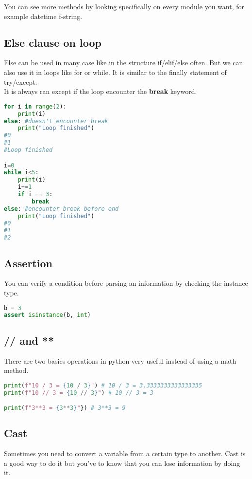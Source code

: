 \documentclass[a4paper, 12pt, titlepage]{scrartcl} %
\begin{document}
You can see more methods by looking specifically on every module you want, for example datetime f-string.

\subsection{Else clause on loop}
\label{subsec:Else}
Else can be used in many case like in the structure if/elif/else often. But we can also use it in loops like for or while. It is similar to the finally statement of try/except. \\
It is always ran except if the loop encounter the \textbf{break} keyword.

\begin{lstlisting}[language=Python]
for i in range(2):
    print(i)
else: #doesn't encounter break
    print("Loop finished")
#0
#1
#Loop finished

i=0
while i<5:
    print(i)
    i+=1
    if i == 3:
        break
else: #encounter break before end
    print("Loop finished")
#0
#1
#2
\end{lstlisting} \vspace{5mm}

\subsection{Assertion}
\label{subsec:Assertion}
You can verify a condition before parsing an information by checking the instance type.
\begin{lstlisting}[language=Python]
b = 3
assert isinstance(b, int)
\end{lstlisting} \vspace{5mm}

\subsection{// and **}
There are two basics operations in python very useful instead of using a math method.
\begin{lstlisting}[language=Python]
print(f"10 / 3 = {10 / 3}") # 10 / 3 = 3.3333333333333335
print(f"10 // 3 = {10 // 3}") # 10 // 3 = 3

print(f"3**3 = {3**3}"}) # 3**3 = 9
\end{lstlisting} \vspace{5mm}

\subsection{Cast}
Sometimes you need to convert a variable from a certain type to another. Cast is a good way to do it but you've to know that you can lose information by doing it. 
\end{document}
